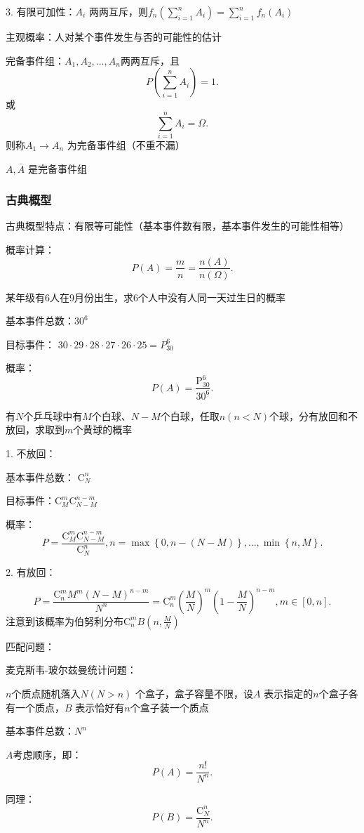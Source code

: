 3. 有限可加性：$A_i$ 两两互斥，则$f_n\left( \sum_{i=1}^{n} A_i \right) =\sum_{i=1}^{n} f_n\left( A_i \right) $
\begin{defi}
    主观概率：人对某个事件发生与否的可能性的估计
\end{defi}

\begin{defi}
    完备事件组：$A_1,A_2,\ldots,A_n$两两互斥，且\[
        P\left( \sum_{i=1}^{n} A_i \right) =1
    .\] 或\[
        \sum_{i=1}^{n} A_i=\Omega
    .\] 则称$A_1\to A_n$ 为完备事件组（不重不漏）
\end{defi}
\begin{eg}
    $A,\bar{A}$ 是完备事件组
\end{eg}
\subsubsection{古典概型}%
\label{subsub:古典概型}
古典概型特点：有限等可能性（基本事件数有限，基本事件发生的可能性相等）
\begin{notation}
    概率计算：\[
        P\left( A \right) =\frac{m}{n} = \frac{n\left( A \right) }{n\left( \Omega \right) }
    .\] 
\end{notation}
\begin{eg}
    某年级有6人在9月份出生，求6个人中没有人同一天过生日的概率

    基本事件总数：$30^6$

    目标事件： $30\cdot 29\cdot 28\cdot 27\cdot 26\cdot 25=P_{30}^{6}$ 

    概率：\[
        P\left( A \right) =\frac{\mathrm{P}_{30}^{6}}{30^6}
    .\] 
\end{eg}
\begin{eg}
    有$N$个乒乓球中有$M$个白球、$N-M$个白球，任取$n(n<N)$个球，分有放回和不放回，求取到$m$个黄球的概率

    1. 不放回：

    基本事件总数： $\mathrm{C}_{N}^{n}$ 

    目标事件：$\mathrm{C}_{M}^{m}\mathrm{C}_{N-M}^{n-m}$ 

    概率： \[
        P=\frac{\mathrm{C}_{M}^{m}\mathrm{C}_{N-M}^{n-m}}{\mathrm{C}_{N}^{n}},n=\max\left\{ 0,n-\left( N-M \right)  \right\}, \ldots,\min\left\{ n,M \right\} 
    .\] 

    2. 有放回：

    \[
    P=\frac{\mathrm{C}_{n}^{m}M^m\left( N-M \right) ^{n-m}}{N^n}=\mathrm{C}_{n}^{m}\left( \frac{M}{N} \right) ^m\left( 1-\frac{M}{N} \right) ^{n-m},m\in \left[ 0,n \right]
    .\] 
    注意到该概率为伯努利分布$\mathrm{C}_{n}^{m}B\left( n,\frac{M}{N} \right) $
\end{eg}
匹配问题：
\begin{eg}
    麦克斯韦-玻尔兹曼统计问题：

    $n$个质点随机落入$N\left( N>n \right) $ 个盒子，盒子容量不限，设$A$ 表示指定的$n$个盒子各有一个质点，$B$ 表示恰好有$n$个盒子装一个质点

    基本事件总数：$N^n$ 

    $A$考虑顺序，即：\[
        P\left( A \right) =\frac{n!}{N^n}
    .\] 

    同理：\[
        P\left( B \right) =\frac{\mathrm{C}_{N}^{n}}{N^n}
    .\] 
\end{eg}        
